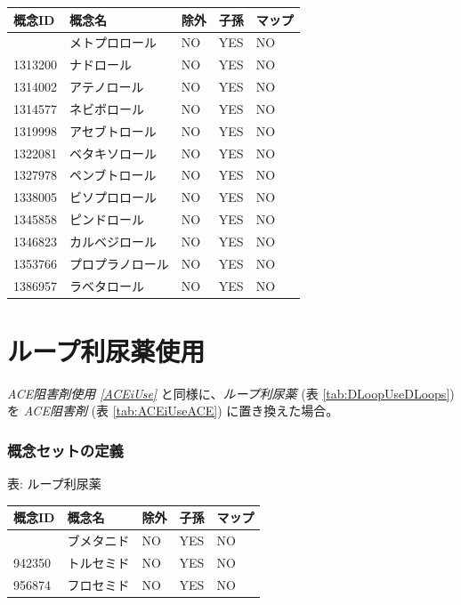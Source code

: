 \documentclass[
  11pt]{book}
\theoremstyle{definition}
\theoremstyle{definition}
\theoremstyle{definition}
\theoremstyle{definition}
\theoremstyle{remark}
\begin{document}
\begin{longtable}[]{@{}lllll@{}}
\toprule\noalign{}
概念ID & 概念名 & 除外 & 子孫 & マップ \\
\midrule\noalign{}
\endhead
\bottomrule\noalign{}
\endlastfoot
1307046 & メトプロロール & NO & YES & NO \\
1313200 & ナドロール & NO & YES & NO \\
1314002 & アテノロール & NO & YES & NO \\
1314577 & ネビボロール & NO & YES & NO \\
1319998 & アセブトロール & NO & YES & NO \\
1322081 & ベタキソロール & NO & YES & NO \\
1327978 & ペンブトロール & NO & YES & NO \\
1338005 & ビソプロロール & NO & YES & NO \\
1345858 & ピンドロール & NO & YES & NO \\
1346823 & カルベジロール & NO & YES & NO \\
1353766 & プロプラノロール & NO & YES & NO \\
1386957 & ラベタロール & NO & YES & NO \\
\end{longtable}

\section{ループ利尿薬使用}\label{DLoopUse}

\emph{ACE阻害剤使用 \ref{ACEiUse}} と同様に、\emph{ループ利尿薬} (表 \ref{tab:DLoopUseDLoops}) を \emph{ACE阻害剤} (表 \ref{tab:ACEiUseACE}) に置き換えた場合。

\subsubsection*{概念セットの定義}\label{ux6982ux5ff5ux30bbux30c3ux30c8ux306eux5b9aux7fa9-3}

表: \label{tab:DLoopUseDLoops} ループ利尿薬

\begin{longtable}[]{@{}lllll@{}}
\toprule\noalign{}
概念ID & 概念名 & 除外 & 子孫 & マップ \\
\midrule\noalign{}
\endhead
\bottomrule\noalign{}
\endlastfoot
932745 & ブメタニド & NO & YES & NO \\
942350 & トルセミド & NO & YES & NO \\
956874 & フロセミド & NO & YES & NO \\
\end{longtable}
\end{document}
